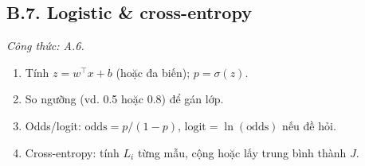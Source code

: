 \subsection*{B.7. Logistic \& cross-entropy}
\textit{Công thức: A.6.}
\begin{enumerate}
  \item Tính \(z=w^\top x+b\) (hoặc đa biến); \(p=\sigma(z)\).
  \item So ngưỡng (vd. 0.5 hoặc 0.8) để gán lớp.
  \item Odds/logit: \(\text{odds}=p/(1-p)\), \(\text{logit}=\ln(\text{odds})\) nếu đề hỏi.
  \item Cross-entropy: tính \(L_i\) từng mẫu, cộng hoặc lấy trung bình thành \(J\).
\end{enumerate}

